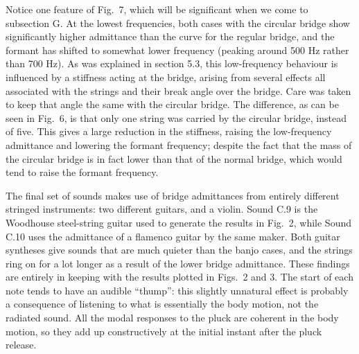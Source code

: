  Notice one feature of Fig.\ 7, which will be significant when we come to 
  subsection G. At the lowest frequencies, both cases with the circular bridge 
  show significantly higher admittance than the curve for the regular bridge, 
  and the formant has shifted to somewhat lower frequency (peaking around 500 
  Hz rather than 700 Hz). As was explained in section 5.3, this low-frequency 
  behaviour is influenced by a stiffness acting at the bridge, arising from 
  several effects all associated with the strings and their break angle over 
  the bridge. Care was taken to keep that angle the same with the circular 
  bridge. The difference, as can be seen in Fig.\ 6, is that only one string 
  was carried by the circular bridge, instead of five. This gives a large 
  reduction in the stiffness, raising the low-frequency admittance and lowering 
  the formant frequency; despite the fact that the mass of the circular bridge 
  is in fact lower than that of the normal bridge, which would tend to raise 
  the formant frequency. 

  The final set of sounds makes use of bridge admittances from entirely 
  different stringed instruments: two different guitars, and a violin. Sound 
  C.9 is the Woodhouse steel-string guitar used to generate the results in 
  Fig.\ 2, while Sound C.10 uses the admittance of a flamenco guitar by the 
  same maker. Both guitar syntheses give sounds that are much quieter than the 
  banjo cases, and the strings ring on for a lot longer as a result of the 
  lower bridge admittance. These findings are entirely in keeping with the 
  results plotted in Figs.\ 2 and 3. The start of each note tends to have an 
  audible ``thump'': this slightly unnatural effect is probably a consequence 
  of listening to what is essentially the body motion, not the radiated sound. 
  All the modal responses to the pluck are coherent in the body motion, so they 
  add up constructively at the initial instant after the pluck release. 



